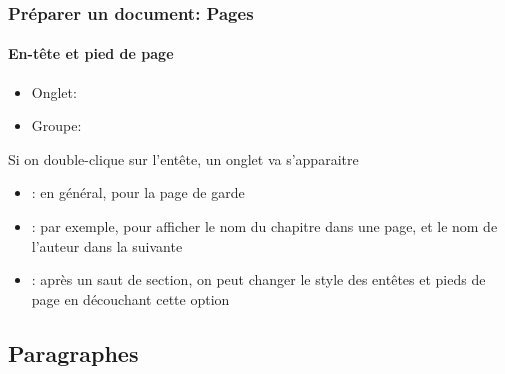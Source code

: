\documentclass[xcolor=table]{beamer}
\begin{document}
\begin{frame}
\frametitle{Préparer un document: Pages}
\framesubtitle{En-tête et pied de page}

\begin{minipage}{0.78\textwidth}
	\begin{itemize}
		\item Onglet:  
		\item Groupe: 
	\end{itemize}
\end{minipage}
\begin{minipage}{0.2\textwidth}
\end{minipage}

\vspace{6pt}
Si on double-clique sur l'entête, un onglet va s'apparaitre
\begin{itemize}
	\item {}: en général, pour la page de garde 
	\item {}: par exemple, pour afficher le nom du chapitre dans une page, et le nom de l'auteur dans la suivante
	\item {}: après un saut de section, on peut changer le style des entêtes et pieds de page en découchant cette option
\end{itemize}


\end{frame}


\subsection{Paragraphes}
\end{document}
